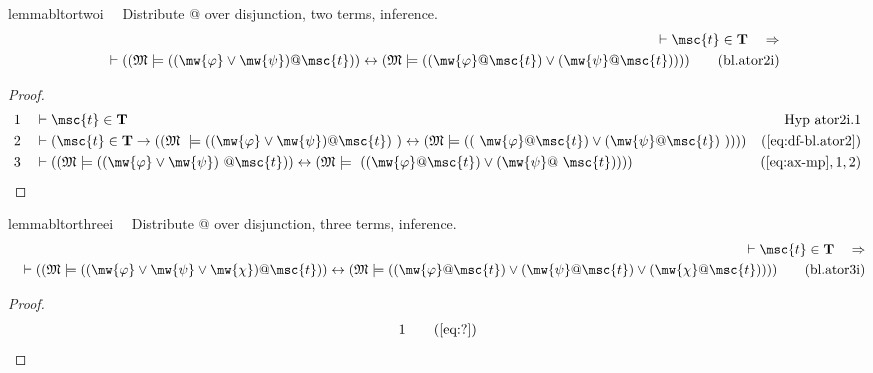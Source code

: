 \begin{restatable}{lemma}{bltortwoi}~~ Distribute @ over disjunction, two terms,
inference.
\begin{align}
\vdash \msc{t} \in \mathbf{T}\quad\Rightarrow \notag \\ 
	\quad \vdash ( ( \mathfrak{M}
    \models ( ( \mw{\varphi} \vee \mw{\psi} ) @ \msc{t} ) ) \leftrightarrow (
    \mathfrak{M} \models ( ( \mw{\varphi} @ \msc{t} ) \vee ( \mw{\psi} @
    \msc{t} ) ) ) )\label{eq:bl.ator2i}\tag{bl.ator2i}
\end{align}
\end{restatable}

\begin{proof}
\begin{align}
  1 &&  & \vdash \msc{t} \in \mathbf{T}&\text{Hyp~ator2i.1}\notag%
  \\ 2 &&  & \vdash ( \msc{t} \in \mathbf{T} \rightarrow ( ( \mathfrak{M}
     ~\models ( ( \mw{\varphi} \vee \mw{\psi} ) @ \msc{t} )
     ~) \leftrightarrow ( \mathfrak{M} \models ( (
     ~\mw{\varphi} @ \msc{t} ) \vee ( \mw{\psi} @ \msc{t} )
     ~) ) ) )&(\mbox{\ref{eq:df-bl.ator2}})\notag
  \\ 3 &&  & \vdash ( ( \mathfrak{M} \models ( ( \mw{\varphi} \vee \mw{\psi} )
     ~@ \msc{t} ) ) \leftrightarrow ( \mathfrak{M} \models
     ~( ( \mw{\varphi} @ \msc{t} ) \vee ( \mw{\psi} @
     ~\msc{t} ) ) ) )&(\mbox{\ref{eq:ax-mp}},1,2)\notag
\end{align}
\end{proof}

\begin{restatable}{lemma}{bltorthreei}~~ Distribute @ over disjunction, three
terms, inference.
\begin{align}
\vdash \msc{t} \in \mathbf{T}\quad\Rightarrow \notag \\ 
	\quad \vdash ( ( \mathfrak{M}
    \models ( ( \mw{\varphi} \vee \mw{\psi} \vee \mw{\chi} ) @ \msc{t} ) )
    \leftrightarrow ( \mathfrak{M} \models ( ( \mw{\varphi} @ \msc{t} ) \vee (
    \mw{\psi} @ \msc{t} ) \vee ( \mw{\chi} @ \msc{t} ) ) )
    )\label{eq:bl.ator3i}\tag{bl.ator3i}
\end{align}
\end{restatable}

\begin{proof}
\begin{align}
  1 &&  & &(\mbox{\ref{eq:?}})\notag
\end{align}
\end{proof}

